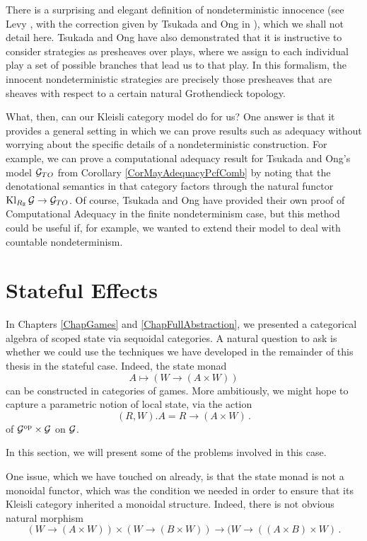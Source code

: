 There is a surprising and elegant definition of nondeterministic innocence (see Levy \cite{levy2014morphisms}, with the correction given by Tsukada and Ong in \cite[Proposition 46]{TsukadaSheaves}), which we shall not detail here.
Tsukada and Ong have also demonstrated that it is instructive to consider strategies as presheaves over plays, where we assign to each individual play a set of possible branches that lead us to that play.  
In this formalism, the innocent nondeterministic strategies are precisely those presheaves that are sheaves with respect to a certain natural Grothendieck topology.

What, then, can our Kleisli category model do for us?
One answer is that it provides a general setting in which we can prove results such as adequacy without worrying about the specific details of a nondeterministic construction.  
For example, we can prove a computational adequacy result for Tsukada and Ong's model $\mathcal G_{TO}$ from Corollary \ref{CorMayAdequacyPcfComb} by noting that the denotational semantics in that category factors through the natural functor $\operatorname{Kl}_{R_{\mathbb{B}}}\mathcal G \to \mathcal G_{TO}$.  
Of course, Tsukada and Ong have provided their own proof of Computational Adequacy in the finite nondeterminism case, but this method could be useful if, for example, we wanted to extend their model to deal with countable nondeterminism.

\section{Stateful Effects}

In Chapters \ref{ChapGames} and \ref{ChapFullAbstraction}, we presented a categorical algebra of scoped state via sequoidal categories.  
A natural question to ask is whether we could use the techniques we have developed in the remainder of this thesis in the stateful case.  
Indeed, the state monad
\[
  A \mapsto (W \to (A \times W))
  \]
can be constructed in categories of games.  
More ambitiously, we might hope to capture a parametric notion of local state, via the action
\[
  (R,W).A = R \to (A \times W)\,.
  \]
of $\mathcal G^{\mathrm{op}} \times \mathcal G$ on $\mathcal G$.

In this section, we will present some of the problems involved in this case.  

One issue, which we have touched on already, is that the state monad is not a monoidal functor, which was the condition we needed in order to ensure that its Kleisli category inherited a monoidal structure.  
Indeed, there is not obvious natural morphism
\[
  (W \to (A \times W)) \times (W \to (B \times W)) \to (W \to ((A \times B) \times W)\,.
  \]

